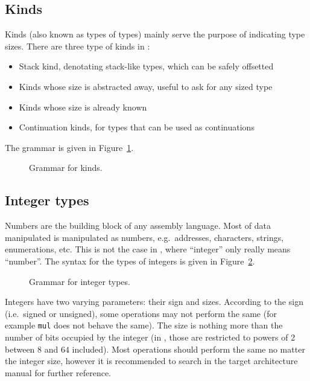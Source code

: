 \subsection{Kinds}\label{subsec:nstar-common-ts-kinds}

Kinds (also known as types of types) mainly serve the purpose of indicating type sizes.
There are three type of kinds in \nstar:
\begin{itemize}
  \item Stack kind, denotating stack-like types, which can be safely offsetted
  \item Kinds whose size is abstracted away, useful to ask for any sized type
  \item Kinds whose size is already known
  \item Continuation kinds, for types that can be used as continuations
\end{itemize}
The grammar is given in Figure~\ref{fig:nstar-common-ts-kinds-syntax}.

\begin{figure}[htb]
  \centering
  \caption{Grammar for kinds.}
  \label{fig:nstar-common-ts-kinds-syntax}
\end{figure}

\subsection{Integer types}\label{subsec:nstar-common-ts-integer}

Numbers are the building block of any assembly language. Most of data manipulated is manipulated as numbers, e.g.\ addresses, characters, strings, enumerations, etc.
This is not the case in \nstar, where ``integer''  only really means ``number''.
The syntax for the types of integers is given in Figure~\ref{fig:nstar-common-ts-integer-syntax}.

\begin{figure}[htb]
  \centering
  \caption{Grammar for integer types.}
  \label{fig:nstar-common-ts-integer-syntax}
\end{figure}

Integers have two varying parameters: their sign and sizes.
According to the sign (i.e.\ signed or unsigned), some operations may not perform the same (for example \texttt{mul} does not behave the same).
The size is nothing more than the number of bits occupied by the integer (in \nstar, those are restricted to powers of 2 between $8$ and $64$ included).
Most operations should perform the same no matter the integer size, however it is recommended to search in the target architecture manual for further reference.

